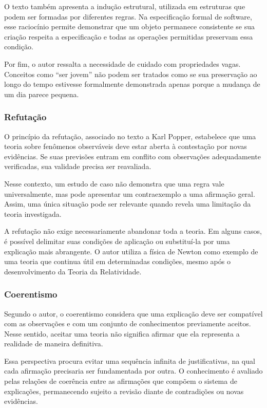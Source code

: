 \documentclass[12pt,a4paper]{article}
\begin{document}
O texto também apresenta a indução estrutural, utilizada em estruturas que podem ser formadas por diferentes regras. Na especificação formal de software, esse raciocínio permite demonstrar que um objeto permanece consistente se sua criação respeita a especificação e todas as operações permitidas preservam essa condição.

Por fim, o autor ressalta a necessidade de cuidado com propriedades vagas. Conceitos como ``ser jovem'' não podem ser tratados como se sua preservação ao longo do tempo estivesse formalmente demonstrada apenas porque a mudança de um dia parece pequena.

\subsubsection{Refutação}

O princípio da refutação, associado no texto a Karl Popper, estabelece que uma teoria sobre fenômenos observáveis deve estar aberta à contestação por novas evidências. Se suas previsões entram em conflito com observações adequadamente verificadas, sua validade precisa ser reavaliada.

Nesse contexto, um estudo de caso não demonstra que uma regra vale universalmente, mas pode apresentar um contraexemplo a uma afirmação geral. Assim, uma única situação pode ser relevante quando revela uma limitação da teoria investigada.

A refutação não exige necessariamente abandonar toda a teoria. Em alguns casos, é possível delimitar suas condições de aplicação ou substituí-la por uma explicação mais abrangente. O autor utiliza a física de Newton como exemplo de uma teoria que continua útil em determinadas condições, mesmo após o desenvolvimento da Teoria da Relatividade.

\subsubsection{Coerentismo}

Segundo o autor, o coerentismo considera que uma explicação deve ser compatível com as observações e com um conjunto de conhecimentos previamente aceitos. Nesse sentido, aceitar uma teoria não significa afirmar que ela representa a realidade de maneira definitiva.

Essa perspectiva procura evitar uma sequência infinita de justificativas, na qual cada afirmação precisaria ser fundamentada por outra. O conhecimento é avaliado pelas relações de coerência entre as afirmações que compõem o sistema de explicações, permanecendo sujeito a revisão diante de contradições ou novas evidências.
\end{document}

